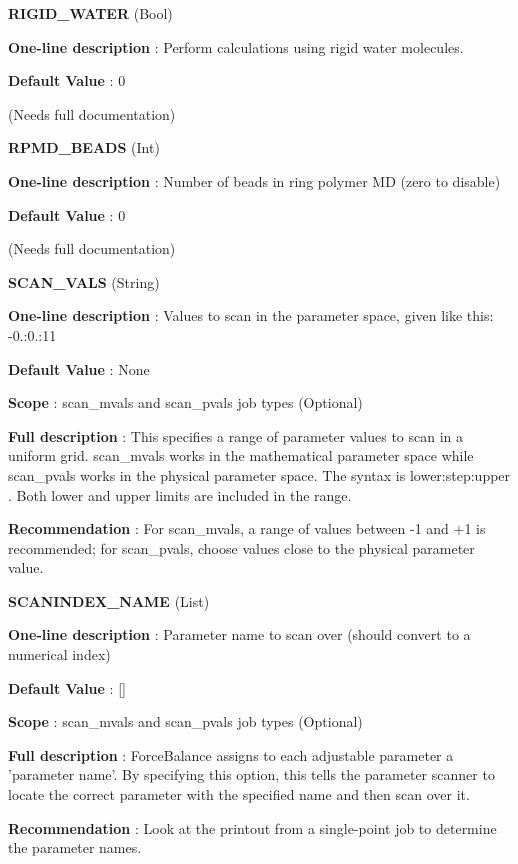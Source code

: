 \begin{DoxyItemize}
\item {\bfseries  R\-I\-G\-I\-D\-\_\-\-W\-A\-T\-E\-R } (Bool) \par
{\bfseries  One-\/line description }\-: Perform calculations using rigid water molecules. \par
{\bfseries  Default Value }\-: 0 \par
(Needs full documentation)\end{DoxyItemize}
\begin{DoxyItemize}
\item {\bfseries  R\-P\-M\-D\-\_\-\-B\-E\-A\-D\-S } (Int) \par
{\bfseries  One-\/line description }\-: Number of beads in ring polymer M\-D (zero to disable) \par
{\bfseries  Default Value }\-: 0 \par
(Needs full documentation)\end{DoxyItemize}
\begin{DoxyItemize}
\item {\bfseries  S\-C\-A\-N\-\_\-\-V\-A\-L\-S } (String) \par
{\bfseries  One-\/line description }\-: Values to scan in the parameter space, given like this\-: -\/0.\-:0.\-:11 \par
{\bfseries  Default Value }\-: None \par
{\bfseries  Scope }\-: scan\-\_\-mvals and scan\-\_\-pvals job types (Optional) \par
{\bfseries  Full description }\-: This specifies a range of parameter values to scan in a uniform grid. scan\-\_\-mvals works in the mathematical parameter space while scan\-\_\-pvals works in the physical parameter space. The syntax is lower\-:step\-:upper . Both lower and upper limits are included in the range. \par
{\bfseries  Recommendation }\-: For scan\-\_\-mvals, a range of values between -\/1 and +1 is recommended; for scan\-\_\-pvals, choose values close to the physical parameter value.\end{DoxyItemize}
\begin{DoxyItemize}
\item {\bfseries  S\-C\-A\-N\-I\-N\-D\-E\-X\-\_\-\-N\-A\-M\-E } (List) \par
{\bfseries  One-\/line description }\-: Parameter name to scan over (should convert to a numerical index) \par
{\bfseries  Default Value }\-: \mbox{[}\mbox{]} \par
{\bfseries  Scope }\-: scan\-\_\-mvals and scan\-\_\-pvals job types (Optional) \par
{\bfseries  Full description }\-: Force\-Balance assigns to each adjustable parameter a 'parameter name'. By specifying this option, this tells the parameter scanner to locate the correct parameter with the specified name and then scan over it. \par
{\bfseries  Recommendation }\-: Look at the printout from a single-\/point job to determine the parameter names.\end{DoxyItemize}
